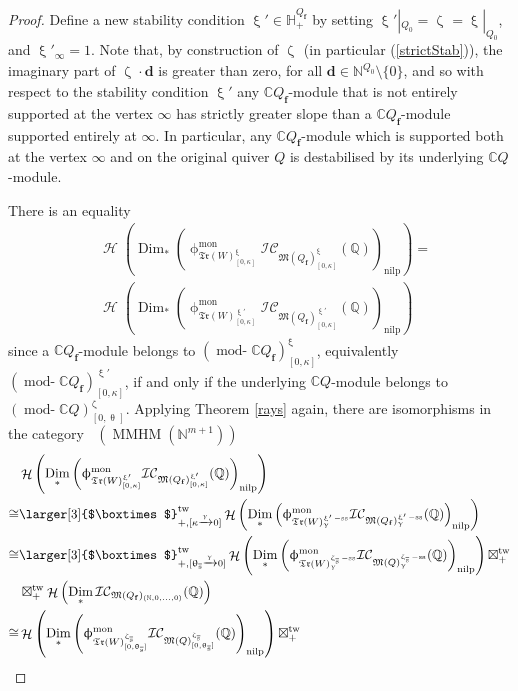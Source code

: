 \documentclass[a4paper,10pt]{amsart}
\newcommand{\dd}{\mathbf{d}}
\newcommand{\ff}{\mathbf{f}}
\newcommand{\Boxtimes}{\mbox{\larger[3]{$\boxtimes$}}}
\newcommand{\QQ}{\mathbb{Q}}
\newcommand{\WWW}{\mathfrak{Tr}(W)}
\newcommand{\Mst}{\mathfrak{M}}
\newcommand{\ICS}{\mathcal{IC}}
\newcommand{\phim}[1]{\phi^{\mon}_{#1}}
\renewcommand{\theta}{\uptheta}
\renewcommand{\gamma}{\upgamma}
\renewcommand{\zeta}{\upzeta}
\renewcommand{\xi}{\upxi}
\renewcommand{\phi}{\upphi}
\DeclareMathOperator{\sst}{-ss}
\DeclareMathOperator{\nilp}{nilp}
\DeclareMathOperator{\Dim}{Dim}
\DeclareMathOperator{\tw}{tw}
\DeclareMathOperator{\mon}{mon}
\DeclareMathOperator{\MMHM}{MMHM}
\DeclareMathOperator{\tmod}{mod-}
\newcommand{\rmod}[1]{\tmod\!#1}
\DeclareMathOperator{\Ss}{\overline{s}}
\DeclareMathOperator{\Ho}{\mathcal{H}}
\DeclareMathOperator{\Dulf}{\mathcal{D}^{\geq, lf}}
\begin{document}
\begin{proof}
Define a new stability condition $\xi'\in\mathbb{H}_+^{Q_{\ff}}$ by setting $\xi'|_{Q_0}=\zeta_{\Ss}=\xi|_{Q_0}$, and $\xi'_{\infty}=1$.  Note that, by construction of $\zeta_{\Ss}$ (in particular (\ref{strictStab})), the imaginary part of $\zeta_{\Ss}\cdot\dd$ is greater than zero, for all $\dd\in\mathbb{N}^{Q_0}\setminus\{0\}$, and so with respect to the stability condition $\xi'$ any $\mathbb{C}Q_{\ff}$-module that is not entirely supported at the vertex $\infty$ has strictly greater slope than a $\mathbb{C}Q_{\ff}$-module supported entirely at $\infty$.  In particular, any $\mathbb{C}Q_{\ff}$-module which is supported both at the vertex $\infty$ and on the original quiver $Q$ is destabilised by its underlying $\mathbb{C}Q$-module.

There is an equality
\begin{align}\label{bigWall}
&\Ho\left(\Dim_*\left(\phim{\WWW^{\xi}_{[0,\kappa]}}\ICS_{\Mst(Q_{\ff})_{[0,\kappa]}^{\xi}}(\mathbb{Q})\right)_{\nilp}\right)=\\&\Ho\left(\Dim_{*}\left(\phim{\WWW^{\xi'}_{[0,\kappa]}}\ICS_{\Mst(Q_{\ff})_{[0,\kappa]}^{\xi'}}(\mathbb{Q})\right)_{\nilp}\right)\nonumber
\end{align}
since a $\mathbb{C}Q_\ff$-module belongs to $(\rmod{\mathbb{C}Q_\ff})^{\xi}_{[0,\kappa]}$, equivalently $(\rmod{\mathbb{C}Q_\ff})^{\xi'}_{[0,\kappa]}$, if and only if the underlying $\mathbb{C}Q$-module belongs to $(\rmod{\mathbb{C}Q})^{\zeta_{\Ss}}_{[0,\theta_{\Ss}]}$.  Applying Theorem \ref{rays} again, there are isomorphisms in the category $\Dulf(\MMHM(\mathbb{N}^{m+1}))$
\begin{align}\label{bigWCF}
&\Ho\left(\Dim_*\left(\phim{\WWW^{\xi'}_{[0,\kappa]}}\ICS_{\Mst(Q_{\ff})_{[0,\kappa]}^{\xi'}}(\mathbb{Q})\right)_{\nilp}\right)\\
\cong&\Boxtimes_{+,[\kappa\xrightarrow{\gamma}0]}^{\tw}\Ho\left(\Dim_*\left(\phim{\WWW_{\gamma}^{\xi'\sst}}\ICS_{\Mst(Q_{\ff})_{\gamma}^{\xi'\sst}}(\mathbb{Q})\right)_{\nilp}\right)\nonumber
\\
\cong & \Boxtimes_{+,[\theta_{\Ss}\xrightarrow{\gamma}0]}^{\tw}\Ho\left(\Dim_*\left(\phim{\WWW_{\gamma}^{\zeta_{\Ss}\sst}}\ICS_{\Mst(Q)_{\gamma}^{\zeta_{\Ss}\sst}}(\mathbb{Q})\right)_{\nilp}\right)\boxtimes_{+}^{\tw}\nonumber
\\
& \boxtimes_+^{\tw}\Ho\left(\Dim_*\ICS_{\Mst(Q_{\ff})_{(\mathbb{N},0,\ldots,0)}}(\mathbb{Q})\right)\nonumber
\\
\cong &\Ho\left(\Dim_*\left(\phim{\WWW_{[0,\theta_{\Ss}]}^{\zeta_{\Ss}}}\ICS_{\Mst(Q)_{[0,\theta_{\Ss}]}^{\zeta_{\Ss}}}(\QQ)\right)_{\nilp}\right)\boxtimes_{+}^{\tw}\nonumber

\end{align}
\end{proof}
\end{document}
